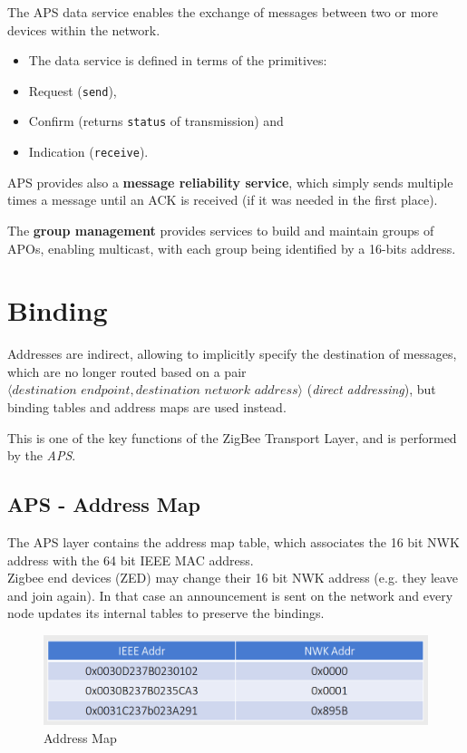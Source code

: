 The APS data service enables the exchange of messages between two or more devices within the network.
\begin{itemize}
   \item The data service is defined in terms of the primitives:
   \item Request (\texttt{send}),
   \item Confirm (returns \texttt{status} of transmission) and
   \item Indication (\texttt{receive}).
\end{itemize}

APS provides also a \textbf{message reliability service}, which simply sends multiple times a message until an ACK is received (if it was needed in the first place).

The \textbf{group management} provides services to build and maintain groups of APOs, enabling multicast, with each group being identified by a 16-bits address.



\section{Binding}
Addresses are indirect, allowing to implicitly specify the destination of messages, which are no longer routed based on a pair $\langle \textit{destination endpoint}, \textit{destination network address} \rangle$ (\textit{direct addressing}), but binding tables and address maps are used instead.

This is one of the key functions of the ZigBee Transport Layer, and is performed by the \textit{APS}.

\subsection{APS - Address Map}
The APS layer contains the address map table, which associates the 16 bit NWK address with the 64 bit IEEE
MAC address.\\
Zigbee end devices (ZED) may change their 16 bit NWK
address (e.g. they leave and join again). In that case an
announcement is sent on the network and every node
updates its internal tables to preserve the bindings.
\begin{figure}[htbp]
   \centering
   \includegraphics{images/zigbee_addressmap.png}
   \caption{Address Map}
   \label{fig:zigbee_addressmap}
\end{figure}

